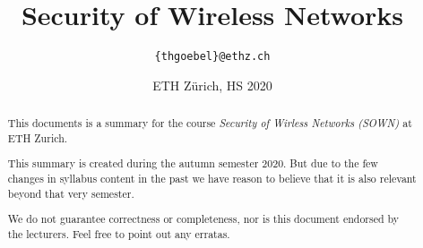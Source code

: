 \documentclass[paper=a4, parskip=half-]{scrartcl}
\title{Security of Wireless Networks}
\author{\texttt{\{thgoebel\}@ethz.ch}}
\date{ETH Zürich, HS 2020}
\begin{document}
\begin{titlepage}
\maketitle
\vspace{5cm}
\thispagestyle{empty}


\begin{abstract}
This documents is a summary for the course \textit{Security of Wirless Networks (SOWN)} at ETH Zurich.

This summary is created during the autumn semester 2020.
But due to the few changes in syllabus content in the past we have reason to believe that it is also relevant beyond that very semester.

We do not guarantee correctness or completeness, nor is this document endorsed by the lecturers.
Feel free to point out any erratas.
\end{abstract}

\end{titlepage}

\tableofcontents
\newpage



\newpage


\newpage


\end{document}
